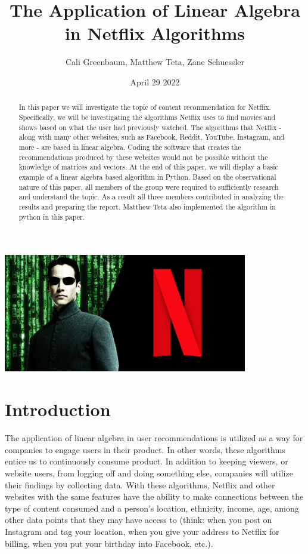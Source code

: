 \documentclass[11pt,a4paper]{article}
\author{Cali Greenbaum, Matthew Teta, Zane Schuessler}
\title{The Application of Linear Algebra in Netflix Algorithms}
\date{April 29 2022}
\begin{document}
\maketitle
\begin{center}
    \includegraphics[width=0.8\textwidth]{title_img.jpeg}
\end{center}
\begin{abstract}
    In this paper we will investigate the topic of content recommendation for Netflix. Specifically, we will be investigating the algorithms Netflix uses to find movies and shows based on what the user had previously watched. The algorithms that Netflix - along with many other websites, such as Facebook, Reddit, YouTube, Instagram, and more - are based in linear algebra. Coding the software that creates the recommendations produced by these websites would not be possible without the knowledge of matrices and vectors. At the end of this paper, we will display a basic example of a linear algebra based algorithm in Python.
    \newline
    \newline
    Based on the observational nature of this paper, all members of the group were required to sufficiently research and understand the topic. As a result all three members contributed in analyzing the results and preparing the report. Matthew Teta also implemented the algorithm in python in this paper.
\end{abstract}

\pagebreak

\tableofcontents

\pagebreak

\section{Introduction} \label{sec_intro}

The application of linear algebra in user recommendations is utilized as a way for companies to engage users in their product. In other words, these algorithms entice us to continuously consume product. In addition to keeping viewers, or website users, from logging off and doing something else, companies will utilize their findings by collecting data. With these algorithms, Netflix and other websites with the same features have the ability to make connections between the type of content consumed and a person's location, ethnicity, income, age, among other data points that they may have access to (think: when you post on Instagram and tag your location, when you give your address to Netflix for billing, when you put your birthday into Facebook, etc.).
\end{document}
